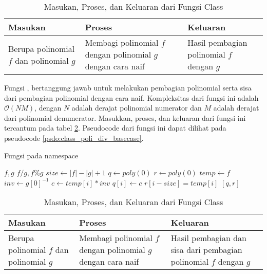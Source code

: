 \begin{table}[]	
	\Centering
	\begin{tabular}{|p{3cm}|p{3cm}|p{3cm}|}
	\hline
	Masukan & Proses & Keluaran \\ \hline
	Berupa polinomial $f$ dan polinomial $g$ & Membagi polinomial $f$ dengan polinomial $g$ dengan cara naif & Hasil pembagian polinomial $f$ dengan $g$\\ \hline
	\end{tabular}
	\caption{Masukan, Proses, dan Keluaran dari Fungsi  Class }
	\label{tab:class_poli_quo_basecase}
\end{table}

\newpage

Fungsi , bertanggung jawab untuk melakukan pembagian polinomial serta sisa dari pembagian polinomial dengan cara naif. Kompleksitas dari fungsi ini adalah $ \mathcal{O}{(NM)} $, dengan $ N $ adalah derajat polinomial numerator dan $ M $ adalah derajat dari polinomial denumerator. Masukkan, proses, dan keluaran dari fungsi ini tercantum pada tabel \ref{tab:class_poli_div_basecase}. Pseudocode dari fungsi ini dapat dilihat pada pseudocode \ref{psdo:class_poli_div_basecase}.

\begin{algorithm}
	\caption{Fungsi  pada namespace }
	\label{psdo:class_poli_div_basecase}
	\begin{algorithmic}[1]
		\Require $ f, g $
		\Ensure $ f / g, f \% g $
		\State $ size \leftarrow |f|-|g|+1 $
		\State $ q \leftarrow poly(0) $
		\State $ r \leftarrow poly(0) $
		\State $ temp \leftarrow f $
		\State $ inv \leftarrow g[0]^{-1} $
			\State $ c \leftarrow temp[i] * inv $
				\State {}
			\EndIf
			\State $ q[i] \leftarrow c $
		\EndFor
			\State $ r[i-size] = temp[i] $
		\EndFor
		\State \Return $ [q,r] $
	\end{algorithmic}
\end{algorithm}

\begin{table}[]	
	\Centering
	\begin{tabular}{|p{3cm}|p{3cm}|p{3cm}|}
	\hline
	Masukan & Proses & Keluaran \\ \hline
	Berupa polinomial $f$ dan polinomial $g$ & Membagi polinomial $f$ dengan polinomial $g$ dengan cara naif & Hasil pembagian dan sisa dari pembagian polinomial $f$ dengan $g$\\ \hline
	\end{tabular}
	\caption{Masukan, Proses, dan Keluaran dari Fungsi  Class }
	\label{tab:class_poli_div_basecase}
\end{table}

